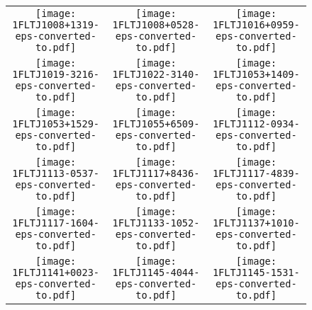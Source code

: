 \begin{figure}[!t]
	\centering            
	\ContinuedFloat
\setlength\tabcolsep{0.0pt}
\begin{tabular}{ccc} 
  \texttt{[image: 1FLTJ1008+1319-eps-converted-to.pdf]}\label{fig:1FLTJ1008+1319}&
  \texttt{[image: 1FLTJ1008+0528-eps-converted-to.pdf]}\label{fig:1FLTJ1008+0528}&
  \texttt{[image: 1FLTJ1016+0959-eps-converted-to.pdf]}\label{fig:1FLTJ1016+0959}\\
  \texttt{[image: 1FLTJ1019-3216-eps-converted-to.pdf]}\label{fig:1FLTJ1019-3216}&
  \texttt{[image: 1FLTJ1022-3140-eps-converted-to.pdf]}\label{fig:1FLTJ1022-3140}&
  \texttt{[image: 1FLTJ1053+1409-eps-converted-to.pdf]}\label{fig:1FLTJ1053+1409}\\
  \texttt{[image: 1FLTJ1053+1529-eps-converted-to.pdf]}\label{fig:1FLTJ1053+1529}&
  \texttt{[image: 1FLTJ1055+6509-eps-converted-to.pdf]}\label{fig:1FLTJ1055+6509}&
  \texttt{[image: 1FLTJ1112-0934-eps-converted-to.pdf]}\label{fig:1FLTJ1112-0934}\\
  \texttt{[image: 1FLTJ1113-0537-eps-converted-to.pdf]}\label{fig:1FLTJ1113-0537}&
  \texttt{[image: 1FLTJ1117+8436-eps-converted-to.pdf]}\label{fig:1FLTJ1117+8436}&
  \texttt{[image: 1FLTJ1117-4839-eps-converted-to.pdf]}\label{fig:1FLTJ1117-4839}\\
  \texttt{[image: 1FLTJ1117-1604-eps-converted-to.pdf]}\label{fig:1FLTJ1117-1604}&
  \texttt{[image: 1FLTJ1133-1052-eps-converted-to.pdf]}\label{fig:1FLTJ1133-1052}&
  \texttt{[image: 1FLTJ1137+1010-eps-converted-to.pdf]}\label{fig:1FLTJ1137+1010}\\
  \texttt{[image: 1FLTJ1141+0023-eps-converted-to.pdf]}\label{fig:1FLTJ1141+0023}&
  \texttt{[image: 1FLTJ1145-4044-eps-converted-to.pdf]}\label{fig:1FLTJ1145-4044}&
  \texttt{[image: 1FLTJ1145-1531-eps-converted-to.pdf]}\label{fig:1FLTJ1145-1531}\\
\end{tabular}
\end{figure}
